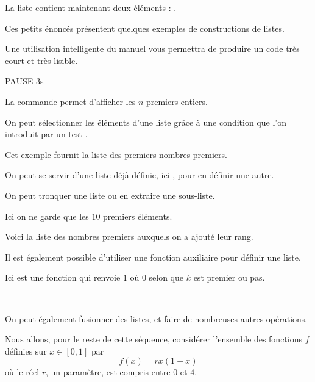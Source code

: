 La liste  contient maintenant deux
  éléments : .


\diapo

Ces petits énoncés présentent quelques exemples de constructions de listes.

Une utilisation intelligente du manuel vous permettra de produire un code très court et très lisible.

PAUSE 3s

\change

La commande  permet d'afficher les $n$ premiers entiers.

\change

On peut sélectionner les éléments d'une liste grâce à une condition que l'on introduit par un test .

Cet exemple fournit la liste des premiers nombres premiers. 


\change

On peut se servir d'une liste déjà définie, ici , pour en définir une autre.

\change

On peut tronquer une liste ou en extraire une sous-liste. 

Ici on ne garde que les $10$ premiers éléments.

\change

Voici la liste des nombres premiers auxquels on a ajouté leur rang.

\change

Il est également possible d'utiliser une fonction auxiliaire pour définir une liste. 

Ici  est une fonction qui renvoie $1$ où $0$ selon que $k$ est premier ou pas. 

~

On peut également fusionner des listes, 
et faire de nombreuses autres opérations.

\diapo

Nous allons, pour le reste de cette séquence, considérer l'ensemble des fonctions $f$ définies 
 sur $x \in [0,1]$ par 
$$f(x)=rx(1-x)$$  où le réel $r$, un paramètre, est compris entre $0$ et $4$.

